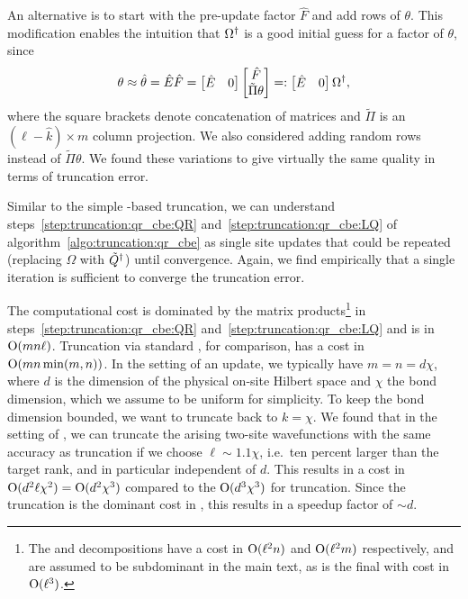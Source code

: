 An alternative is to start with the pre-update factor $\hat{F}$ and add rows of $\theta$.
%
This modification enables the intuition that $\Omega^\dagger$ is a good initial guess for a factor of $\theta$, since
\begin{equation}
    \theta 
    \approx \hat\theta 
    = \hat{E} \hat{F}
    = \begin{bmatrix} \hat{E} & 0 \end{bmatrix}  \begin{bmatrix} \hat{F} \\ \tilde{\Pi}\theta \end{bmatrix}
    =: \begin{bmatrix} \hat{E} & 0 \end{bmatrix} \Omega^\dagger
    ,
\end{equation}
where the square brackets denote concatenation of matrices and $\tilde{\Pi}$ is an $(\ell - \hat{k}) \times m$ column projection.
%
We also considered adding random rows instead of $\tilde{\Pi}\theta$.
%
We found these variations to give virtually the same quality in terms of truncation error.

Similar to the simple -based truncation, we can understand steps~\ref{step:truncation:qr_cbe:QR} and~\ref{step:truncation:qr_cbe:LQ} of algorithm~\ref{algo:truncation:qr_cbe} as single site updates that could be repeated (replacing $\Omega$ with $\tilde Q^\dagger$) until convergence.
%
Again, we find empirically that a single iteration is sufficient to converge the truncation error.

%
The computational cost is dominated by the matrix products\footnote{
    The  and  decompositions have a cost in $\mathrm{O}(\ell^2 n)$ and $\mathrm{O}(\ell^2 m)$ respectively, and are assumed to be subdominant in the main text, as is the final  with cost in $\mathrm{O}(\ell^3)$.
} in steps~\ref{step:truncation:qr_cbe:QR} and~\ref{step:truncation:qr_cbe:LQ} and is in $\mathrm{O}(mn\ell)$.
%
Truncation via standard , for comparison, has a cost in $\mathrm{O} (mn \min(m,n))$.
%
In the setting of an  update, we typically have $m = n = d \chi$, where $d$ is the dimension of the physical on-site Hilbert space and $\chi$ the  bond dimension, which we assume to be uniform for simplicity.
%
To keep the  bond dimension bounded, we want to truncate back to $k = \chi$.
%
We found that in the setting of , we can truncate the arising two-site wavefunctions with the same accuracy as  truncation if we choose $\ell \sim 1.1 \chi$, i.e.~ten percent larger than the target rank, and in particular independent of $d$.
%
This results in a cost in $\mathrm{O} (d^2 \ell \chi^2) = \mathrm{O} (d^2 \chi^3)$ compared to the $\mathrm{O} (d^3 \chi^3)$ for  truncation.
%
Since the truncation is the dominant cost in , this results in a speedup factor of $\sim d$.

